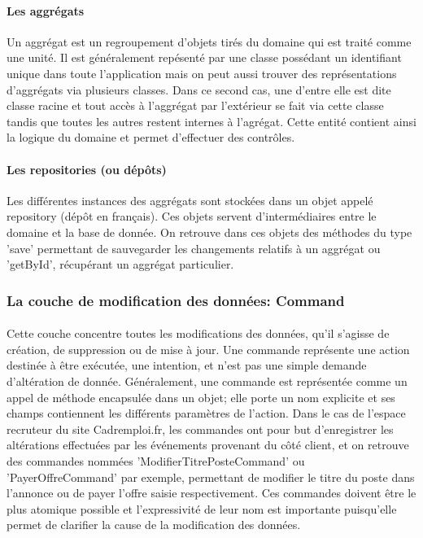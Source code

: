 \paragraph{Les aggrégats}
\label{par:Les aggrégats}
Un aggrégat est un regroupement d'objets tirés du domaine qui est traité comme une unité.
Il est généralement repésenté par une classe possédant un identifiant unique dans toute l'application mais on peut aussi trouver des représentations d'aggrégats via plusieurs classes.
Dans ce second cas, une d'entre elle est dite classe racine et tout accès à l'aggrégat par l'extérieur se fait via cette classe tandis que toutes les autres restent internes à l'agrégat.
Cette entité contient ainsi la logique du domaine et permet d'effectuer des contrôles.
\paragraph{Les repositories (ou dépôts)}
\label{par:Les repositories (ou dépôts)}
Les différentes instances des aggrégats sont stockées dans un objet appelé repository (dépôt en français).
Ces objets servent d'intermédiaires entre le domaine et la base de donnée.
On retrouve dans ces objets des méthodes du type 'save' permettant de sauvegarder les changements relatifs à un aggrégat ou 'getById', récupérant un aggrégat particulier.

\subsubsection{La couche de modification des données: Command}
\label{subs:La couche de modification des données: Command}
\paragraph{}
Cette couche concentre toutes les modifications des données, qu'il s'agisse de création, de suppression ou de mise à jour.
Une commande représente une action destinée à être exécutée, une intention, et n'est pas une simple demande d'altération de donnée.
Généralement, une commande est représentée comme un appel de méthode encapsulée dans un objet; elle porte un nom explicite et ses champs contiennent les différents paramètres de l'action.
Dans le cas de l'espace recruteur du site Cadremploi.fr, les commandes ont pour but d'enregistrer les altérations effectuées par les événements provenant du côté client, et on retrouve des commandes nommées 'ModifierTitrePosteCommand' ou 'PayerOffreCommand' par exemple, permettant de modifier le titre du poste dans l'annonce ou de payer l'offre saisie respectivement.
Ces commandes doivent être le plus atomique possible et l'expressivité de leur nom est importante puisqu'elle permet de clarifier la cause de la modification des données.
